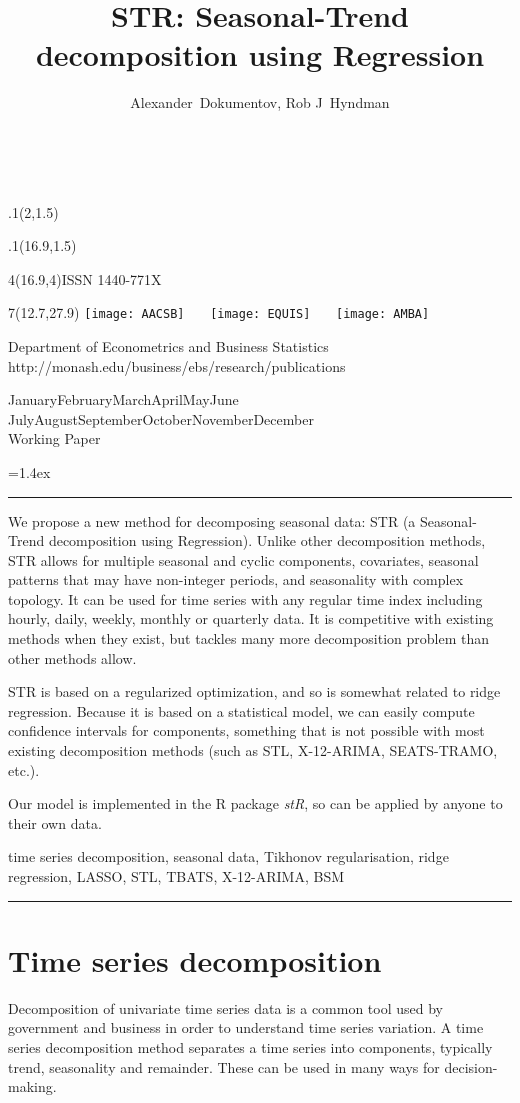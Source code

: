 \documentclass[11pt,a4paper,]{article}
\title{STR: Seasonal-Trend decomposition using Regression}
\author{Alexander~Dokumentov, Rob J~Hyndman}
\date{\sf\Date~\Month~\Year}
\makeatletter
\def\Date{\number\day}
\def\Month{\ifcase\month\or
 January\or February\or March\or April\or May\or June\or
 July\or August\or September\or October\or November\or December\fi}
\def\Year{\number\year}
\def\showjel{{\large\textsf{\textbf{JEL classification:}}~\@jel}}
\def\cover{{\sffamily\setcounter{page}{0}
        \thispagestyle{empty}
        \placefig{2}{1.5}{width=5cm}{monash2}
        \placefig{16.9}{1.5}{width=2.1cm}{MBusSchool}
        \begin{textblock}{4}(16.9,4)ISSN 1440-771X\end{textblock}
        \begin{textblock}{7}(12.7,27.9)\hfill
        \texttt{[image: AACSB]}~~~
        \texttt{[image: EQUIS]}~~~
        \texttt{[image: AMBA]}
        \end{textblock}
        \vspace*{2cm}
        \begin{center}\Large
        Department of Econometrics and Business Statistics\\[.5cm]
        \footnotesize http://monash.edu/business/ebs/research/publications
        \end{center}\vspace{2cm}
        \begin{center}
        \fbox{\parbox{14cm}{\begin{onehalfspace}\centering\Huge\vspace*{0.3cm}
                \textsf{\textbf{\expandafter{\@title}}}\vspace{1cm}\par
                \LARGE\@author\end{onehalfspace}
        }}
        \end{center}
        \vfill
                \begin{center}\Large
                \Month~\Year\\[1cm]
                Working Paper \@wp
        \end{center}\vspace*{2cm}}}
\def\pageone{{\sffamily\setstretch{1}%
        \thispagestyle{empty}%
        \vbox to \textheight{%
        \raggedright\baselineskip=1.2cm
     {\fontsize{24.88}{30}\sffamily\textbf{\expandafter{\@title}}}
        \vspace{2cm}\par
        \hspace{1cm}\parbox{14cm}{\sffamily\large\@addresses}\vspace{1cm}\vfill
        \hspace{1cm}{\large\Date~\Month~\Year}\\[1cm]
        \hspace{1cm}\showjel\vss}}}
\def\blindtitle{{\sffamily
     \thispagestyle{plain}\raggedright\baselineskip=1.2cm
     {\fontsize{24.88}{30}\sffamily\textbf{\expandafter{\@title}}}\vspace{1cm}\par
        }}
\def\titlepage{{\cover\newpage\pageone\newpage\blindtitle}}
\let\maketitle\titlepage
\newenvironment{keywords}{\par\vspace{0.5cm}\noindent{\sffamily\textbf{Keywords:}}}{\vspace{0.25cm}\par\hrule\vspace{0.5cm}\par}
\renewenvironment{abstract}{\begin{minipage}{\textwidth}\parskip=1.4ex\noindent
\hrule\vspace{0.1cm}\par{\sffamily\textbf{\abstractname}}\newline}
  {\end{minipage}}
\def\placefig#1#2#3#4{\begin{textblock}{.1}(#1,#2)\rlap{\texttt{[image: \#4]}}\end{textblock}}
\makeatother
\begin{document}
\maketitle
\begin{abstract}
We propose a new method for decomposing seasonal data: STR (a Seasonal-Trend decomposition using Regression). Unlike other decomposition methods, STR allows for multiple seasonal and cyclic components, covariates, seasonal patterns that may have non-integer periods, and seasonality with complex topology. It can be used for time series with any regular time index including hourly, daily, weekly, monthly or quarterly data. It is competitive with existing methods when they exist, but tackles many more decomposition problem than other methods allow.

\par

STR is based on a regularized optimization, and so is somewhat related to ridge regression. Because it is based on a statistical model, we can easily compute confidence intervals for components, something that is not possible with most existing decomposition methods (such as STL, X-12-ARIMA, SEATS-TRAMO, etc.).

\par

Our model is implemented in the R package \emph{stR}, so can be applied by anyone to their own data.
\end{abstract}
\begin{keywords}
time series decomposition, seasonal data, Tikhonov regularisation, ridge regression, LASSO, STL, TBATS, X-12-ARIMA, BSM
\end{keywords}

\hypertarget{time-series-decomposition}{%
\section{Time series decomposition}\label{time-series-decomposition}}

Decomposition of univariate time series data is a common tool used by government and business in order to understand time series variation. A time series decomposition method separates a time series into components, typically trend, seasonality and remainder. These can be used in many ways for decision-making.
\end{document}
